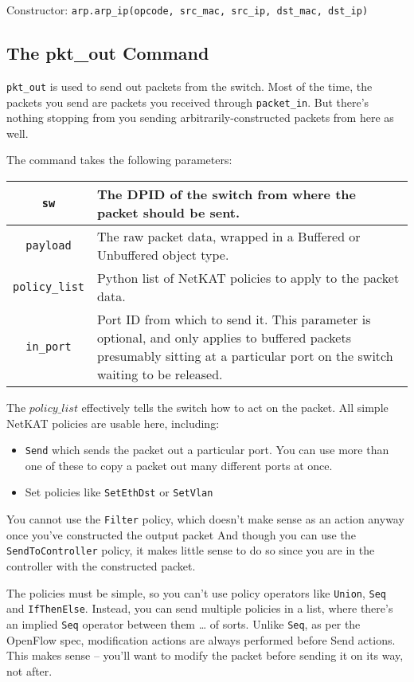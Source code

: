 \bigskip
Constructor: \texttt{arp.arp\_ip(opcode, src\_mac, src\_ip, dst\_mac, dst\_ip)}

\subsection{The pkt\_out Command}

\texttt{pkt\_out} is used to send out packets from the switch.  
Most of the time, the packets you send are packets you received through \texttt{packet\_in}.
But there's nothing stopping from you sending arbitrarily-constructed packets from here as well.  

The command takes the following parameters:

\bigskip
\begin{tabularx}{6in}{|c|X|}
\hline\hline
\texttt{sw} & The DPID of the switch from where the packet should be sent.
\\ \hline
\texttt{payload} & The raw packet data, wrapped in a 
Buffered or Unbuffered object type.
\\ \hline
\texttt{policy\_list} & Python list of NetKAT policies to apply to the packet data.
\\ \hline
\texttt{in\_port} & Port ID from which to send it.
This parameter is optional, and only applies to buffered packets presumably sitting at a particular port on
the switch waiting to be released.
\\ \hline\hline
\end{tabularx}

\bigskip

The $policy\_list$ effectively tells the switch how to act on the packet.  
All simple NetKAT policies are usable here, including:

\begin{itemize}
  \item \texttt{Send} which sends the packet out a particular port.  You can use more than one of these to copy
  a packet out many different ports at once.  
  \item Set policies like \texttt{SetEthDst} or \texttt{SetVlan}
\end{itemize}

You cannot use the \texttt{Filter} policy, which doesn't make sense as an action anyway
once you've constructed the output packet
And though you can use the \texttt{SendToController} policy, it makes little sense to do so since you are
in the controller with the constructed packet.  

The policies must be simple, so you can't use policy operators like \texttt{Union}, \texttt{Seq} 
and \texttt{IfThenElse}.  
Instead, you can send multiple policies in a list, where there's an implied \texttt{Seq} operator between them \ldots 
of sorts.
Unlike \texttt{Seq}, as per the OpenFlow spec, modification actions are always performed before Send actions.
This makes sense -- you'll want to modify the packet before sending it on its way, not after.  

